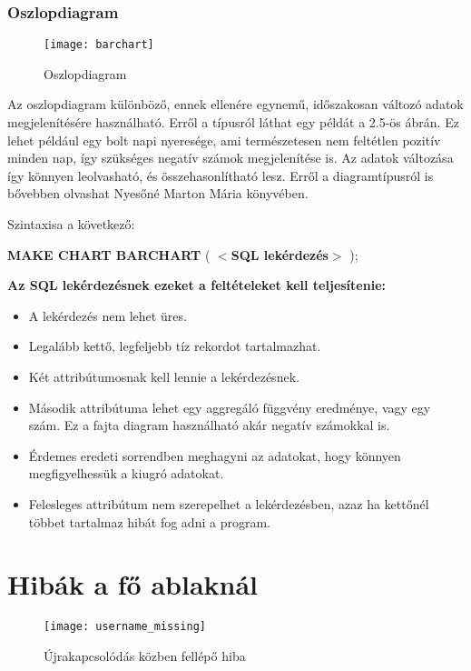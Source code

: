 \subsubsection{Oszlopdiagram}
\begin{figure}[ht]
  \begin{center}
    \texttt{[image: barchart]}
  \end{center}
 \caption{Oszlopdiagram}
\end{figure}

Az oszlopdiagram különböző, ennek ellenére egynemű, időszakosan változó adatok megjelenítésére használható. Erről a típusról láthat egy példát a
2.5-ös ábrán. Ez lehet például egy
bolt napi nyeresége, ami természetesen nem feltétlen pozitív minden nap, így szükséges negatív számok megjelenítése is. Az adatok
változása így könnyen leolvasható, és összehasonlítható lesz. Erről a diagramtípusról is bővebben olvashat Nyesőné Marton Mária
könyvében\cite{szamadat}.

Szintaxisa a következő:

\textbf{{\color{awesomeblue} MAKE CHART BARCHART }} ( \textbf{$<$SQL lekérdezés$>$} );

\textbf{Az SQL lekérdezésnek ezeket a feltételeket kell teljesítenie:}
\begin{itemize}
  \item A lekérdezés nem lehet üres.
  \item Legalább kettő, legfeljebb tíz rekordot tartalmazhat.
  \item Két attribútumosnak kell lennie a lekérdezésnek.
  \item Második attribútuma lehet egy aggregáló függvény eredménye, vagy egy szám. Ez a fajta diagram
  használható akár negatív számokkal is.
  \item Érdemes eredeti sorrendben meghagyni az adatokat, hogy könnyen megfigyelhessük a kiugró adatokat.
  \item Felesleges attribútum nem szerepelhet a lekérdezésben, azaz ha kettőnél többet tartalmaz hibát fog adni a program.
\end{itemize}

\section{Hibák a fő ablaknál}

\begin{figure}[ht]
  \begin{center}
  \texttt{[image: username\_missing]}
  \end{center}
 \caption{Újrakapcsolódás közben fellépő hiba}
\end{figure}

